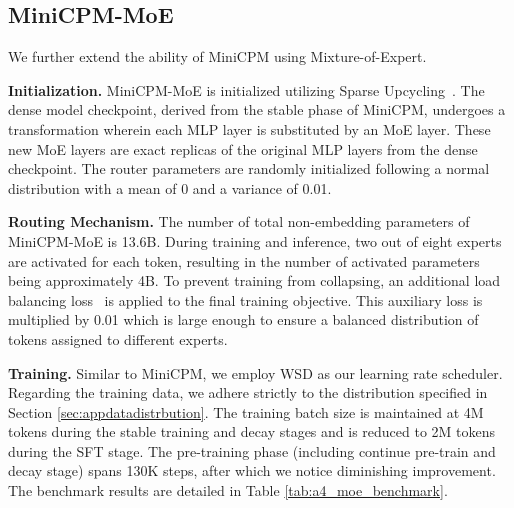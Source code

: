 
\vspace{-2mm}
\subsection{MiniCPM-MoE}
We further extend the ability of MiniCPM using Mixture-of-Expert. 

\textbf{Initialization.}
MiniCPM-MoE is initialized utilizing Sparse Upcycling~\citep{komatsuzaki2022sparse}. The dense model checkpoint, derived from the stable phase of MiniCPM, undergoes a transformation wherein each MLP layer is substituted by an MoE layer. These new MoE layers are exact replicas of the original MLP layers from the dense checkpoint. The router parameters are randomly initialized following a normal distribution with a mean of 0 and a variance of 0.01.


\textbf{Routing Mechanism.}
The number of total non-embedding parameters of MiniCPM-MoE is 13.6B. 
During training and inference, two out of eight experts are activated for each token, resulting in the number of activated parameters being approximately 4B. To prevent training from collapsing, an additional load balancing loss~\citep{fedus2022switch} is applied to the final training objective. This auxiliary loss is multiplied by 0.01 which is large enough to ensure a balanced distribution of tokens assigned to different experts.

\textbf{Training.}
 Similar to MiniCPM, we employ WSD as our learning rate scheduler. Regarding the training data, we adhere strictly to the distribution specified in Section \ref{sec:appdatadistrbution}. The training batch size is maintained at 4M tokens during the stable training and decay stages and is reduced to 2M tokens during the SFT stage. The pre-training phase (including continue pre-train and decay stage) spans 130K steps, after which we notice diminishing improvement. The benchmark results are detailed in Table \ref{tab:a4_moe_benchmark}.


